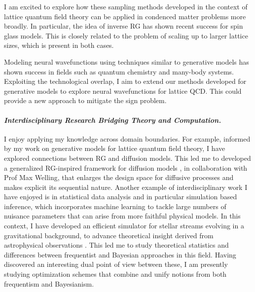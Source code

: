 \documentclass[11pt]{article}
\begin{document}
I am excited to explore how these sampling methods developed in the context of lattice quantum field theory can be applied in condenced matter problems more broadly.
In particular, the idea of inverse RG has shown recent success for spin glass models.
This is closely related to the problem of scaling up to larger lattice sizes, which is present in both cases.

Modeling neural wavefunctions using techniques similar to generative models has shown success in fields such as quantum chemistry and many-body systems. Exploiting the technological overlap, I aim to extend our methods developed for generative models to explore neural wavefunctions for lattice QCD. This could provide a new approach to mitigate the sign problem.

\paragraph{\textit{{Interdisciplinary Research Bridging Theory and Computation.}}}
I enjoy applying my knowledge across domain boundaries.
For example, informed by my work on generative models for lattice quantum field theory, I have explored connections between RG and diffusion models.
This led me to developed a generalized RG-inspired framework for diffusion models \cite{gerdes2024gudgenerationunifieddiffusion}, in collaboration with Prof Max Welling, that enlarges the design space for diffusive processes and makes explicit its sequential nature.
Another example of interdisciplinary work I have enjoyed is in statistical data analysis and in particular simulation based inference, which incorporates machine learning to tackle large numbers of nuisance parameters that can arise from more faithful physical models.
In this context, I have developed an efficient simulator for stellar streams evolving in a gravitational background, to advance theoretical insight derived from astrophysical observations  \cite{alvey2023AlbatrossScalable}.
This led me to study theoretical statistics and differences between frequentist and Bayesian approaches in this field.
Having discovered an interesting dual point of view between these, I am presently studying optimization schemes that combine and unify notions from both frequentism and Bayesianism.


{
    \small
    
}
\end{document}
